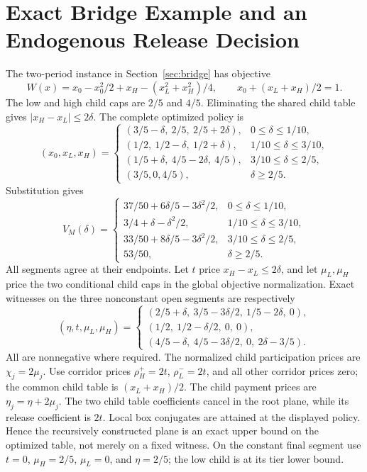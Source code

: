 \section{Exact Bridge Example and an Endogenous Release Decision}\label{ec:bridgeexample}
The two-period instance in Section~\ref{sec:bridge} has objective
\[
 W(x)=x_0-x_0^2/2+x_H-(x_L^2+x_H^2)/4,
 \qquad x_0+(x_L+x_H)/2=1.
\]
The low and high child caps are $2/5$ and $4/5$. Eliminating the shared child table gives $|x_H-x_L|\leq2\delta$. The complete optimized policy is
\[
 (x_0,x_L,x_H)=
 \begin{cases}
 (3/5-\delta,\ 2/5,\ 2/5+2\delta),&0\leq\delta\leq1/10,\\
 (1/2,\ 1/2-\delta,\ 1/2+\delta),&1/10\leq\delta\leq3/10,\\
 (1/5+\delta,\ 4/5-2\delta,\ 4/5),&3/10\leq\delta\leq2/5,\\
 (3/5,0,4/5),&\delta\geq2/5.
 \end{cases}
\]
Substitution gives
\[
 V_M(\delta)=
 \begin{cases}
 37/50+6\delta/5-3\delta^2/2,&0\leq\delta\leq1/10,\\
 3/4+\delta-\delta^2/2,&1/10\leq\delta\leq3/10,\\
 33/50+8\delta/5-3\delta^2/2,&3/10\leq\delta\leq2/5,\\
 53/50,&\delta\geq2/5.
 \end{cases}
\]
All segments agree at their endpoints. Let $t$ price $x_H-x_L\leq2\delta$, and let $\mu_L,\mu_H$ price the two conditional child caps in the global objective normalization. Exact witnesses on the three nonconstant open segments are respectively
\[
 (\eta,t,\mu_L,\mu_H)=
 \begin{cases}
 (2/5+\delta,\ 3/5-3\delta/2,\ 1/5-2\delta,\ 0),\\
 (1/2,\ 1/2-\delta/2,\ 0,\ 0),\\
 (4/5-\delta,\ 4/5-3\delta/2,\ 0,\ 2\delta-3/5).
 \end{cases}
\]
All are nonnegative where required. The normalized child participation prices are $\chi_j=2\mu_j$. Use corridor prices $\rho_H^+=2t$, $\rho_L^-=2t$, and all other corridor prices zero; the common child table is $(x_L+x_H)/2$. The child payment prices are $\eta_j=\eta+2\mu_j$. The two child table coefficients cancel in the root plane, while its release coefficient is $2t$. Local box conjugates are attained at the displayed policy. Hence the recursively constructed plane is an exact upper bound on the optimized table, not merely on a fixed witness. On the constant final segment use $t=0$, $\mu_H=2/5$, $\mu_L=0$, and $\eta=2/5$; the low child is at its tier lower bound.


